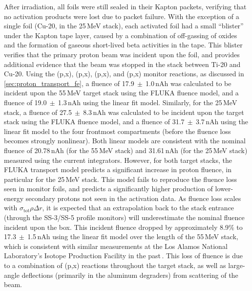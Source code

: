 After irradiation, all foils were 
still sealed in their Kapton packets, verifying that no activation products were lost due to packet failure.
With the exception of a single foil (Cu-20, in the 25\,MeV stack), each activated foil had a small \enquote{blister} under the Kapton tape layer, caused by a combination of 
off-gassing of oxides and the formation of gaseous short-lived beta activities in the tape.
This blister   verifies that the primary proton beam was incident upon the foil, and provides additional 
evidence 
that the beam was stopped in the stack between Ti-20 and Cu-20.
Using the (p,x), (p,x), (p,x), and (p,x) monitor reactions, as discussed in \autoref{sec:proton_transport_fe}, a fluence of 17.9$~\pm~$1.0\,nAh 
was calculated to be incident upon the 55\,MeV target stack using the FLUKA fluence model, and a  fluence of 19.0$~\pm~$1.3\,nAh using the linear fit model.
Similarly, for the 25\,MeV stack, a fluence of 27.5$~\pm~$8.3\,nAh 
was calculated to be incident upon the 
target stack using the FLUKA fluence model, and a  fluence of 31.7$~\pm~$3.7\,nAh using the linear fit model to the four frontmost compartments (before the fluence loss becomes strongly nonlinear).
Both linear models are consistent with the nominal fluence of 20.78\,nAh (for the 55\,MeV stack) and 31.61\,nAh (for the 25\,MeV stack) measured using the 
current integrators.
However, for both target stacks, the FLUKA transport model predicts a significant increase in proton fluence, in particular for the 25\,MeV stack.
This model fails to reproduce the fluence loss seen in monitor foils, and predicts a significantly higher production of lower-energy secondary protons not seen in the activation data.
As fluence loss scales with $\sigma_{\mathrm{tot}}\rho\Delta r$, it is expected that an extrapolation back to the stack entrance (through the SS-3/SS-5 profile monitors) will underestimate the nominal fluence incident upon the box.
This incident fluence dropped by approximately 
8.9\% to  17.3$~\pm~$1.5\,nAh using the linear fit model over the length of the 55\,MeV stack, which is consistent with similar measurements at the Los Alamos National Laboratory's Isotope Production Facility in the past\,\cite{Voyles2018a,Graves2016}.
This loss of fluence is due to a combination of 
(p,x) reactions throughout the target stack, as well as large-angle deflections (primarily in the aluminum degraders) from scattering of the beam.






